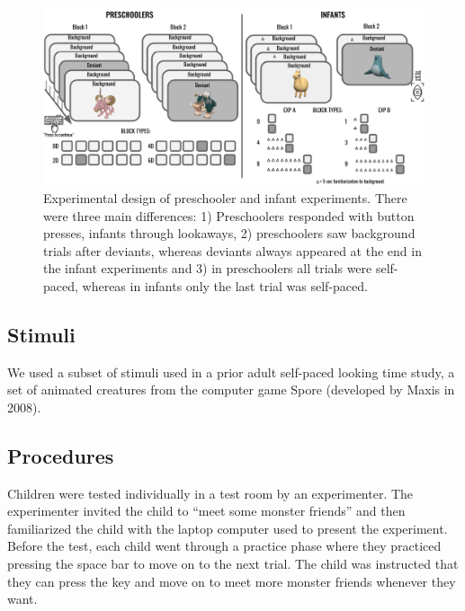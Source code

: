 \documentclass[10pt, letterpaper]{article}
\newenvironment{CodeChunk}{}{}
\begin{document}
\begin{CodeChunk}
\begin{figure}[h]

{\centering \includegraphics{figs/experimental_design-1} 

}

\caption[Experimental design of preschooler and infant experiments]{Experimental design of preschooler and infant experiments. There were three main differences: 1) Preschoolers responded with button presses, infants through lookaways, 2) preschoolers saw background trials after deviants, whereas deviants always appeared at the end in the infant experiments and 3) in preschoolers all trials were self-paced, whereas in infants only the last trial was self-paced.}\label{fig:experimental_design}
\end{figure}
\end{CodeChunk}

\hypertarget{stimuli}{%
\subsection{Stimuli}\label{stimuli}}

We used a subset of stimuli used in a prior adult self-paced looking
time study, a set of animated creatures from the computer game Spore
(developed by Maxis in 2008).

\hypertarget{procedures}{%
\subsection{Procedures}\label{procedures}}

Children were tested individually in a test room by an experimenter. The
experimenter invited the child to ``meet some monster friends'' and then
familiarized the child with the laptop computer used to present the
experiment. Before the test, each child went through a practice phase
where they practiced pressing the space bar to move on to the next
trial. The child was instructed that they can press the key and move on
to meet more monster friends whenever they want.
\end{document}
